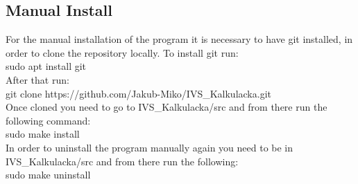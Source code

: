 \documentclass{article}
\begin{document}
	\subsection{Manual Install}
	For the manual installation of the program it is necessary to have git installed, in order to clone the repository locally. To install git run:\\
	sudo apt install git\\
	After that run:\\
	git clone https://github.com/Jakub-Miko/IVS\_Kalkulacka.git\\
	Once cloned you need to go to IVS\_Kalkulacka/src and from there run the following command:\\
	sudo make install\\
	In order to uninstall the program manually again you need to be in IVS\_Kalkulacka/src and from there run the following:\\
	sudo make uninstall\\
	\newpage
	
\end{document}
